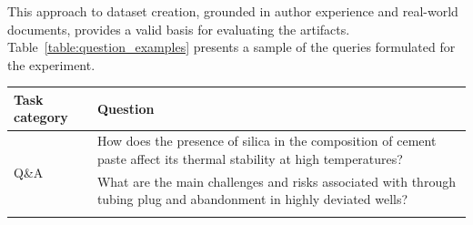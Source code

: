             This approach to dataset creation, grounded in author experience and real-world documents, provides a valid basis for evaluating the artifacts. Table~\ref{table:question_examples} presents a sample of the queries formulated for the experiment.


            
            \begin{table}[h]
                \centering
                \scriptsize
                \sloppy
                \begin{tabular}{|p{.1\linewidth}|p{.9\linewidth}|}
                \hline
                \textbf{Task category} & \textbf{Question} \\   \hline
                \multirow{17}{*}{Q\&A} & How does the presence of silica in the composition of cement 
                paste affect its thermal stability at high temperatures? \\ \cline{2-2}
                & What are the main challenges and risks associated with through tubing plug and abandonment in highly deviated wells? \\ \cline{2-2}

\end{tabular}
\end{table}
